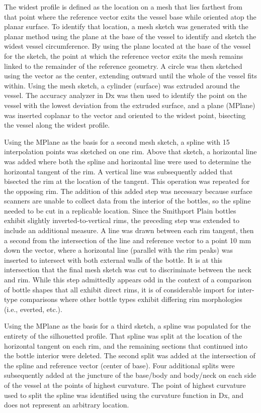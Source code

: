 \documentclass[article]{sa}
\begin{document}
The widest profile is defined as the location on a mesh that lies farthest from that point where the reference vector exits the vessel base while oriented atop the planar surface. To identify that location, a mesh sketch was generated with the planar method using the plane at the base of the vessel to identify and sketch the widest vessel circumference. By using the plane located at the base of the vessel for the sketch, the point at which the reference vector exits the mesh remains linked to the remainder of the reference geometry. A circle was then sketched using the vector as the center, extending outward until the whole of the vessel fits within. Using the mesh sketch, a cylinder (surface) was extruded around the vessel. The accuracy analyzer in Dx was then used to identify the point on the vessel with the lowest deviation from the extruded surface, and a plane (MPlane) was inserted coplanar to the vector and oriented to the widest point, bisecting the vessel along the widest profile.

Using the MPlane as the basis for a second mesh sketch, a spline with 15 interpolation points was sketched on one rim. Above that sketch, a horizontal line was added where both the spline and horizontal line were used to determine the horizontal tangent of the rim. A vertical line was subsequently added that bisected the rim at the location of the tangent. This operation was repeated for the opposing rim. The addition of this added step was necessary because surface scanners are unable to collect data from the interior of the bottles, so the spline needed to be cut in a replicable location. Since the Smithport Plain bottles exhibit slightly inverted-to-vertical rims, the preceding step was extended to include an additional measure. A line was drawn between each rim tangent, then a second from the intersection of the line and reference vector to a point 10 mm down the vector, where a horizontal line (parallel with the rim peaks) was inserted to intersect with both external walls of the bottle. It is at this intersection that the final mesh sketch was cut to discriminate between the neck and rim. While this step admittedly appears odd in the context of a comparison of bottle shapes that all exhibit direct rims, it is of considerable import for inter-type comparisons where other bottle types exhibit differing rim morphologies (i.e., everted, etc.).

Using the MPlane as the basis for a third sketch, a spline was populated for the entirety of the silhouetted profile. That spline was split at the location of the horizontal tangent on each rim, and the remaining sections that continued into the bottle interior were deleted. The second split was added at the intersection of the spline and reference vector (center of base). Four additional splits were subsequently added at the juncture of the base/body and body/neck on each side of the vessel at the points of highest curvature. The point of highest curvature used to split the spline was identified using the curvature function in Dx, and does not represent an arbitrary location.
\end{document}
